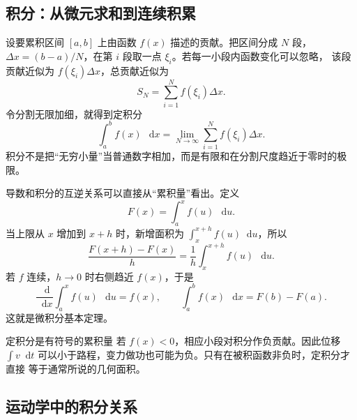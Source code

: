 \documentclass[UTF8,zihao=-4,oneside,openany]{ctexbook}
\numberwithin{equation}{section}
\newcommand{\dd}{\mathop{}\!\mathrm{d}}
\begin{document}
\subsection{积分：从微元求和到连续积累}

设要累积区间 $[a,b]$ 上由函数 $f(x)$ 描述的贡献。把区间分成 $N$ 段，
$\Delta x=(b-a)/N$，在第 $i$ 段取一点 $\xi_i$。若每一小段内函数变化可以忽略，
该段贡献近似为 $f(\xi_i)\Delta x$，总贡献近似为
\[
  S_N=\sum_{i=1}^{N}f(\xi_i)\Delta x.
\]
令分割无限加细，就得到定积分
\begin{equation}
  \int_a^b f(x)\,\dd x
  =\lim_{N\to\infty}\sum_{i=1}^{N}f(\xi_i)\Delta x.
  \label{eq:riemann-integral}
\end{equation}
积分不是把“无穷小量”当普通数字相加，而是有限和在分割尺度趋近于零时的极限。

\begin{center}
\end{center}

导数和积分的互逆关系可以直接从“累积量”看出。定义
\[
  F(x)=\int_a^x f(u)\,\dd u.
\]
当上限从 $x$ 增加到 $x+h$ 时，新增面积为 $\int_x^{x+h}f(u)\dd u$，所以
\[
  \frac{F(x+h)-F(x)}{h}
  =\frac1h\int_x^{x+h}f(u)\,\dd u.
\]
若 $f$ 连续，$h\to0$ 时右侧趋近 $f(x)$，于是
\begin{equation}
  \frac{\dd}{\dd x}\int_a^x f(u)\,\dd u=f(x),
  \qquad
  \int_a^b f(x)\,\dd x=F(b)-F(a).
  \label{eq:fundamental-theorem}
\end{equation}
这就是微积分基本定理。

\begin{warningbox}{定积分是有符号的累积量}
若 $f(x)<0$，相应小段对积分作负贡献。因此位移
$\int v\dd t$ 可以小于路程，变力做功也可能为负。只有在被积函数非负时，定积分才直接
等于通常所说的几何面积。
\end{warningbox}

\subsection{运动学中的积分关系}
\end{document}
